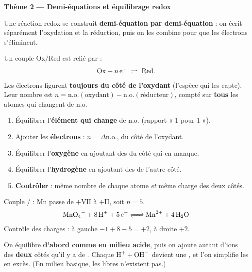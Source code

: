 \documentclass[11pt,a4paper]{article}
\begin{document}
\begin{center}\color{primarydark}\Large\bfseries Thème 2 — Demi-équations et équilibrage redox\end{center}

Une réaction redox se construit \textbf{demi-équation par demi-équation} : on écrit séparément
l'oxydation et la réduction, puis on les combine pour que les électrons s'éliminent.

\begin{cle}
Un couple $\mathrm{Ox}/\mathrm{Red}$ est relié par :
\[
\mathrm{Ox}+n\,\ce{e^-}\;\rightleftharpoons\;\mathrm{Red}.
\]
Les électrons figurent \textbf{toujours du côté de l'oxydant} (l'espèce qui les capte). Leur nombre
est $n=\mathrm{n.o.}(\text{oxydant})-\mathrm{n.o.}(\text{réducteur})$, compté sur \textbf{tous} les
atomes qui changent de n.o.
\end{cle}

\begin{methode}
\begin{enumerate}[label=\textbf{\arabic*.},leftmargin=2.0em,topsep=1pt,itemsep=1pt]
  \item Équilibrer l'\textbf{élément qui change} de n.o. (rapport « 1 pour 1 »).
  \item Ajouter les \textbf{électrons} : $n=\Delta\mathrm{n.o.}$, du côté de l'oxydant.
  \item Équilibrer l'\textbf{oxygène} en ajoutant des  du côté qui en manque.
  \item Équilibrer l'\textbf{hydrogène} en ajoutant des  de l'autre côté.
  \item \textbf{Contrôler} : même nombre de chaque atome \emph{et} même charge des deux côtés.
\end{enumerate}
\end{methode}

\begin{exemplebox}
Couple / : Mn passe de $+\mathrm{VII}$ à $+\mathrm{II}$, soit $n=5$.
\[
\ce{MnO4^- + 8 H+ + 5 e^- <=> Mn^{2+} + 4 H2O}
\]
Contrôle des charges : à gauche $-1+8-5=+2$, à droite $+2$. \checkmark
\end{exemplebox}

\begin{cle}
On équilibre \textbf{d'abord comme en milieu acide}, puis on ajoute autant d'ions  des
\textbf{deux} côtés qu'il y a de . Chaque $\ce{H+ + OH^-}$ devient une , et l'on
simplifie les  en excès. (En milieu basique, les  libres n'existent pas.)
\end{cle}
\end{document}
